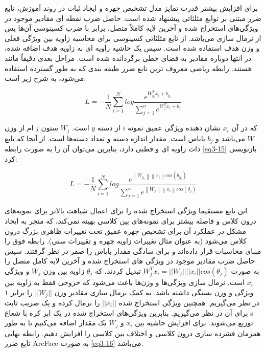 \noindent
برای افزایش بیشتر قدرت تمایز مدل تشخیص چهره و ایجاد ثبات در روند آموزش، تابع ضرر مبتنی بر توابع مثلثاتی پیشنهاد شده است. حاصل ضرب نقطه ای مقادیر موجود در ویژگی‌های استخراج شده و آخرین لایه کاملاً متصل، برابر با ضرب کسینوسی آن‌ها پس از نرمال سازی می‌باشد‌. از تابع مثلثاتی کسینوسی برای محاسبه زاویه بین ویژگی فعلی و وزن هدف استفاده شده ‌است. سپس یک حاشیه زاویه ای به زاویه هدف اضافه شده‌، در انتها دوباره مقادیر به فضای خطی برگردانده شده است. مراحل بعدی دقیقاً مانند  هستند. رابطه ریاضی  معروف ترین تابع ضرر طبقه بندی که به طور گسترده استفاده می‌شود، به شرح زیر است:

\begin{equation}
	\label{eq3-14}
	L = - \frac{1}{N} \sum_{i=1}^{N} log \frac{e^{{W_{y_i}^T} x_i + b_{y_i}}}{\sum_{j=1}^{n} e^{{W_j^T} x_i + b_j}} 
\end{equation}

\noindent
که در آن $x_i$ نشان دهنده ویژگی عمیق نمونه $i$ از دسته $y$ است. $W_j$ ستون $j$  ام از وزن $W$ می‌باشد و $b_j$ بایاس است. مقدار  اندازه دسته و  تعداد دسته‌ها است. از آنجا که تابع  ذات زاویه ای و قطبی دارد، بنابرین می‌توان آن را به صورت رابطه \ref{eq3-15} بازنویسی کرد:

\begin{equation}
	\label{eq3-15}
	L = - \frac{1}{N} \sum_{i=1}^{N} log \frac{e^{\left\|W_{y_i}\right\| \left\|x_i\right\| cos(\theta_{y_i})}}{\sum_{j=1}^{n} e^{\left\|W_j\right\| \left\|x_i\right\| cos(\theta_j)}}
\end{equation}

\noindent
این تابع مستقیما ویژگی استخراج شده را برای اعمال شباهت بالاتر برای نمونه‌های درون کلاس و فاصله بیشتر برای نمونه‌های بین کلاسی بهینه نمی‌کند، که منجر به ایجاد مشکل در عملکرد آن برای تشخیص چهره عمیق تحت تغییرات ظاهری بزرگ درون کلاس می‌شود (به عنوان مثال تغییرات زاویه چهره و تقییرات سنی). رابطه فوق را مبنای محاسبات قرار داده‌اند و برای سادگی مقدار بایاس را صفر در نظر گرفتند. سپس حاصل ضرب مقادیر موجود در ویژگی های استخراج شده و آخرین لایه کامل متصل را به صورت
$W_j^T x_i = ||W_j|| ||x_i|| cos(θ_j)$
تبدیل کردند، که $\theta_j$ زاویه بین وزن $W_j$ و ویژگی $x_i$ است. نرمال سازی ویژگی‌ها و وزن‌ها باعث می‌شود که خروجی فقط به زاویه بین ویژگی و وزن بستگی داشته باشد. به کمک نرمال سازی مقادیر وزن $||W_j||$ را برابر ۱ در نظر می‌گیریم. همچنین ویژگی استخراج شده $||x_i||$ را نرمال کرده و یک ضریب ثابت  برای آن در نظر می‌گیریم. ‌‌‌بنابرین ویژگی‌های استخراج شده در یک ابر کره با شعاع s توزیع می‌شوند. برای افزایش حاشیه بین $x_i$ و $W_j$ یک مقدار  اضافه می‌کنیم تا به طور همزمان فشرده سازی درون کلاسی و اختلاف بین کلاسی را افزایش دهیم. رابطه نهایی تابع ضرر ArcFace به صورت \ref{eq3-16} می‌باشد.

